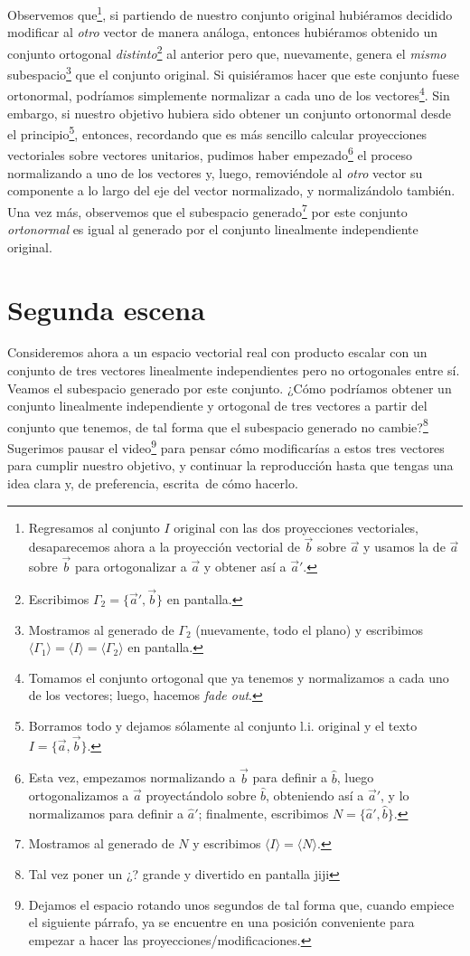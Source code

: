 \documentclass[12pt,dvipsnames]{article}
\numberwithin{equation}{section}
\begin{document}
Observemos que\footnote{Regresamos al conjunto $I$ original con las dos proyecciones vectoriales, desaparecemos ahora a la proyección vectorial de $\vec{b}$ sobre $\vec{a}$ y usamos la de $\vec{a}$ sobre $\vec{b}$ para ortogonalizar a $\vec{a}$ y obtener así a $\vec{a}'$.}, si partiendo de nuestro conjunto original hubiéramos decidido modificar al \emph{otro} vector de manera análoga, entonces hubiéramos obtenido un conjunto ortogonal \emph{distinto}\footnote{Escribimos $\Gamma_2=\{\vec{a}',\vec{b}\}$ en pantalla.} al anterior pero que, nuevamente, genera el \emph{mismo} subespacio\footnote{Mostramos al generado de $\Gamma_2$ (nuevamente, todo el plano) y escribimos $\langle \Gamma_1 \rangle = \langle I \rangle=\langle \Gamma_2 \rangle$ en pantalla.} que el conjunto original. Si quisiéramos hacer que este conjunto fuese ortonormal, podríamos simplemente normalizar a cada uno de los vectores\footnote{Tomamos el conjunto ortogonal que ya tenemos y normalizamos a cada uno de los vectores; luego, hacemos \emph{fade out}.}. Sin embargo, si nuestro objetivo hubiera sido obtener un conjunto ortonormal desde el principio\footnote{Borramos todo y dejamos sólamente al conjunto l.i. original y el texto $I=\{\vec{a},\vec{b}\}$.}, entonces, recordando que es más sencillo calcular proyecciones vectoriales sobre vectores unitarios, pudimos haber empezado\footnote{Esta vez, empezamos normalizando a $\vec{b}$ para definir a $\hat{b}$, luego ortogonalizamos a $\vec{a}$ proyectándolo sobre $\hat{b}$, obteniendo así a $\vec{a}'$, y lo normalizamos para definir a $\hat{a}'$; finalmente, escribimos $N=\{\hat{a}',\hat{b}\}$.} el proceso normalizando a uno de los vectores y, luego, removiéndole al \emph{otro} vector su componente a lo largo del eje del vector normalizado, y normalizándolo también. Una vez más, observemos que el subespacio generado\footnote{Mostramos al generado de $N$ y escribimos $\langle I\rangle=\langle N\rangle$.} por este conjunto \emph{ortonormal} es igual al generado por el conjunto linealmente independiente original.


\newpage
\section{Segunda escena}

Consideremos ahora a un espacio vectorial real con producto escalar con un conjunto de tres vectores linealmente independientes pero no ortogonales entre sí. Veamos el subespacio generado por este conjunto. ¿Cómo podríamos obtener un conjunto linealmente independiente y ortogonal de tres vectores a partir del conjunto que tenemos, de tal forma que el subespacio generado no cambie?\footnote{Tal vez poner un ¿? grande y divertido en pantalla jiji} Sugerimos pausar el video\footnote{Dejamos el espacio rotando unos segundos de tal forma que, cuando empiece el siguiente párrafo, ya se encuentre en una posición conveniente para empezar a hacer las proyecciones/modificaciones.} para pensar cómo modificarías a estos tres vectores para cumplir nuestro objetivo, y continuar la reproducción hasta que tengas una idea clara \textemdash y, de preferencia, escrita\textemdash \ de cómo hacerlo.
\end{document}
